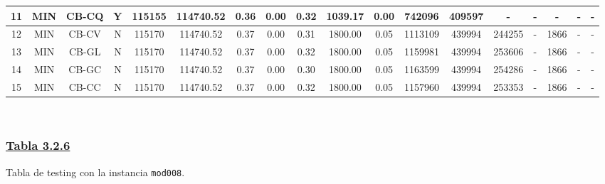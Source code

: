 {\begin{tabular}{ *{17}{c|} c }
\hline
11 & MIN & CB-CQ & Y & 115155 & 114740.52 & 0.36 & 0.00 & 0.32 & 1039.17 & 0.00 & 742096 & 409597 & - & - & - & - & -\\
\hline
12 & MIN & CB-CV & N & 115170 & 114740.52 & 0.37 & 0.00 & 0.31 & 1800.00 & 0.05 & 1113109 & 439994 & 244255 & - & 1866 & - & -\\
\hline
13 & MIN & CB-GL & N & 115170 & 114740.52 & 0.37 & 0.00 & 0.32 & 1800.00 & 0.05 & 1159981 & 439994 & 253606 & - & 1866 & - & -\\
\hline
14 & MIN & CB-GC & N & 115170 & 114740.52 & 0.37 & 0.00 & 0.30 & 1800.00 & 0.05 & 1163599 & 439994 & 254286 & - & 1866 & - & -\\
\hline
15 & MIN & CB-CC & N & 115170 & 114740.52 & 0.37 & 0.00 & 0.32 & 1800.00 & 0.05 & 1157960 & 439994 & 253353 & - & 1866 & - & -\\
\hline
\end{tabular}\\
\vspace{4mm}
}

\subsubsection*{\underline{Tabla 3.2.6}}
\noindent Tabla de testing con la instancia \verb_mod008_.\\

